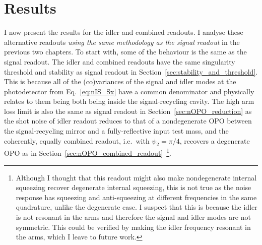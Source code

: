 \section{Results}
\label{sec:idlerRO_initial_results}

I now present the results for the idler and combined readouts. %
I analyse these alternative readouts \emph{using the same methodology as the signal readout} in the previous two chapters. 
To start with, some of the behaviour is the same as the signal readout. 
The idler and combined readouts have the same singularity threshold and stability as signal readout in Section~\ref{sec:stability_and_threshold}. This is because all of the (co)variances of the signal and idler modes at the photodetector from Eq.~\ref{eq:nIS_Sx} have a common denominator and physically relates to them being both being inside the signal-recycling cavity. %
The high arm loss limit is also the same as signal readout in Section~\ref{sec:nOPO_reduction} as the shot noise of idler readout reduces to that of a nondegenerate OPO between the signal-recycling mirror and a fully-reflective input test mass, and the coherently, equally combined readout, i.e.\ with $\psi_2=\pi/4$, recovers a degenerate OPO as in Section~\ref{sec:nOPO_combined_readout}~\footnote{Although I thought that this readout might also make nondegenerate internal squeezing recover degenerate internal squeezing, this is not true as the noise response has squeezing and anti-squeezing at different frequencies in the same quadrature, unlike the degenerate case. I suspect that this is because the idler is not resonant in the arms and therefore the signal and idler modes are not symmetric. This could be verified by making the idler frequency resonant in the arms, which I leave to future work.}.
